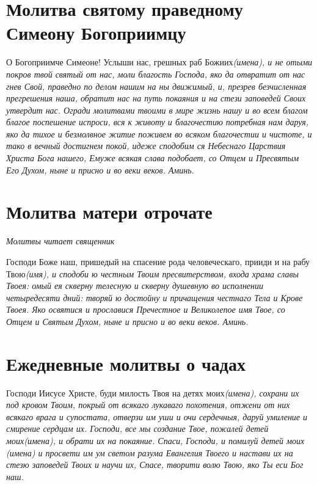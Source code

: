 \section{Молитва святому праведному Симеону Богоприимцу}
 


О Богоприимче Симеоне! Услыши нас, грешных раб Божиих\itshape  (имена),\normalfont{} и не отыми покров твой святый от нас, моли благость Господа, яко да отвратит от нас гнев Свой, праведно по делом нашим на ны движимый, и, презрев безчисленная прегрешения наша, обратит нас на путь покаяния и на стези заповедей Своих утвердит нас. Огради молитвами твоими в мире жизнь нашу и во всем благом благое поспешение испроси, вся к животу и благочестию потребная нам даруя, яко да тихое и безмолвное житие поживем во всяком благочестии и чистоте, и тако в вечный достигнем покой, идеже сподобим ся Небеснаго Царствия Христа Бога нашего, Емуже всякая слава подобает, со Отцем и Пресвятым Его Духом, ныне и присно и во веки веков. Аминь. 


\section{Молитва матери отрочате}
 


\itshape Молитвы читает священник\normalfont{}

Господи Боже наш, пришедый на спасение рода человеческаго, прииди и на рабу Твою\itshape  (имя)\normalfont{}, и сподоби ю честным Твоим пресвитерством, входа храма славы Твоея: омый ея скверну телесную и скверну душевную во исполнении четыредесяти дний: творяй ю достойну и причащения честнаго Тела и Крове Твоея. Яко освятися и прославися Пречестное и Великолепое имя Твое, со Отцем и Святым Духом, ныне и присно и во веки веков. Аминь. 





\section{Ежедневные молитвы о чадах}
 


Господи Иисусе Христе, буди милость Твоя на детях моих\itshape  (имена)\normalfont{}, сохрани их под кровом Твоим, покрый от всякаго лукаваго похотения, отжени от них всякаго врага и супостата, отверзи им уши и очи сердечныя, даруй умиление и смирение сердцам их. Господи, все мы создание Твое, пожалей детей моих\itshape  (имена)\normalfont{}, и обрати их на покаяние. Спаси, Господи, и помилуй детей мои\itshape х (имена\normalfont{}) и просвети им ум светом разума Евангелия Твоего и настави их на стезю заповедей Твоих и научи их, Спасе, творити волю Твою, яко Ты еси Бог наш. 


